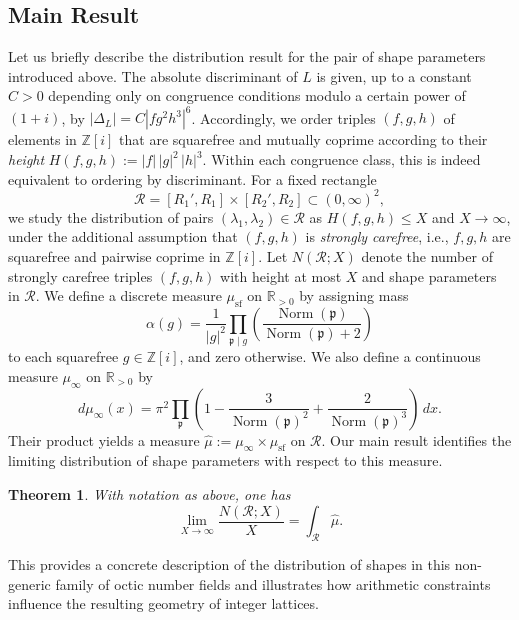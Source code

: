 \documentclass{amsart}
\newtheorem{lthm}{Theorem}
\newcommand{\op}[1]{\operatorname{#1}}
\newcommand{\R}{\mathbb{R}}
\newcommand{\Z}{\mathbb{Z}}
\theoremstyle{plain}
\theoremstyle{definition}
\theoremstyle{remark}
\numberwithin{equation}{section}
\begin{document}
\subsection{Main Result} 
Let us briefly describe the distribution result for the pair of shape parameters introduced above. The absolute discriminant of $L$ is given, up to a constant $C>0$ depending
only on congruence conditions modulo a certain power of $(1+i)$, by $|\Delta_L|= C|f g^2 h^3|^6$.
Accordingly, we order triples $(f,g,h)$ of elements in $\Z[i]$ that are squarefree and mutually coprime according to their \emph{height} $H(f,g,h):=|f|\,|g|^2\,|h|^3$. Within each congruence class, this is indeed equivalent to ordering by discriminant.
For a fixed rectangle
\[
\mathcal R=[R_1',R_1]\times[R_2',R_2]\subset(0,\infty)^2,
\]
we study the distribution of pairs $(\lambda_1,\lambda_2)\in\mathcal R$
as $H(f,g,h)\le X$ and $X\to\infty$, under the additional assumption
that $(f,g,h)$ is \emph{strongly carefree}, i.e., $f,g,h$ are squarefree
and pairwise coprime in $\Z[i]$. Let $N(\mathcal R;X)$ denote the number of strongly carefree triples
$(f,g,h)$ with height at most $X$ and shape parameters in $\mathcal R$. We define a discrete measure $\mu_{\mathrm{sf}}$
on $\R_{>0}$ by assigning mass
\[
\alpha(g)
=
\frac{1}{|g|^{2}}
\prod_{\mathfrak p\mid g}
\left(
\frac{\op{Norm}(\mathfrak p)}
{\op{Norm}(\mathfrak p)+2}
\right)
\]
to each squarefree $g\in\Z[i]$, and zero otherwise.
We also define a continuous measure $\mu_\infty$ on $\R_{>0}$ by
\[
d\mu_\infty(x)
=
\pi^2
\prod_{\mathfrak p}
\left(1-\dfrac{3}{\op{Norm}(\mathfrak p)^2}+\dfrac{2}{\op{Norm}(\mathfrak p)^3}\right)\,dx.
\]
Their product yields a measure $\hat{\mu}:=\mu_\infty\times \mu_{\mathrm{sf}}$ on $\mathcal R$. Our main result identifies the limiting distribution of shape
parameters with respect to this measure.

\begin{lthm}\label{thm a}
With notation as above, one has
\[
\lim_{X\to\infty}
\frac{N(\mathcal R;X)}{X}
=
\int_{\mathcal R}\hat{\mu}.
\]
\end{lthm}
This provides a concrete
description of the distribution of shapes in this non-generic family of octic number fields and illustrates how arithmetic constraints influence the resulting
geometry of integer lattices.
\end{document}
